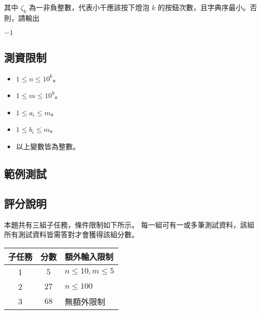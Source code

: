 其中 \(\zeta_k\) 為一非負整數，代表小千應該按下燈泡 \(k\)
的按鈕次數，且字典序最小。否則，請輸出

\begin{format}
\f{
$-1$
}
\end{format}

\subsection{測資限制}

\begin{itemize}
\tightlist
\item
  \(1 \le n \le 10^6\)。
\item
  \(1 \le m \le 10^9\)。
\item
  \(1 \le a_i \le m\)。
\item
  \(1 \le b_i \le m\)。
\item
  以上變數皆為整數。
\end{itemize}

\subsection{範例測試}

\begin{example}
%
%
\end{example}

\subsection{評分說明}

本題共有三組子任務，條件限制如下所示。
每一組可有一或多筆測試資料，該組所有測試資料皆需答對才會獲得該組分數。

\begin{longtable}[]{@{}ccl@{}}
\toprule
子任務 & 分數 & 額外輸入限制 \\
\midrule
\endhead
1 & \(5\) & \(n \le 10, m \le 5\) \\
2 & \(27\) & \(n \le 100\) \\
3 & \(68\) & 無額外限制 \\
\bottomrule
\end{longtable}
